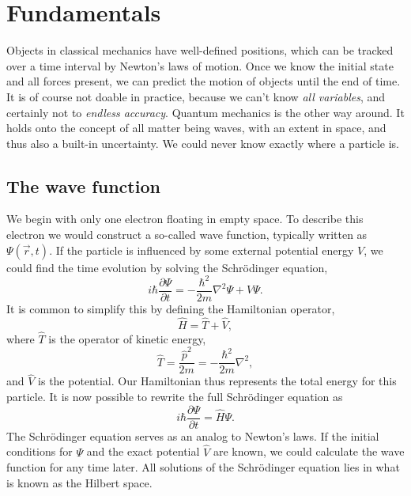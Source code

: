 \section{Fundamentals}
Objects in classical mechanics have well-defined positions, which can
be tracked over a time interval by Newton's laws of motion.
Once we know the initial state and all forces present, we can predict the
motion of objects until the end of time. 
It is of course not doable in practice, because we can't know \textit{all
variables}, and certainly not to \textit{endless accuracy}.
Quantum mechanics is the other way around.
It holds onto the concept of all matter being waves, with an extent in space,
and thus also a built-in uncertainty.
We could never know exactly where a particle is.

\subsection{The wave function}
We begin with only one electron floating in empty space.
To describe this electron we would construct a so-called wave function,
typically written as $\Psi(\vec{r},t)$.
If the particle is influenced by some external potential energy $V$, we could find
the time evolution by solving the Schrödinger equation,
\begin{equation}
\label{eq:qm:schrodinger}
i\hbar \frac{\partial \Psi}{\partial t} = - \frac{\hbar^2}{2m}
\nabla^2 \Psi+ V \Psi .
\end{equation}
It is common to simplify this by defining the Hamiltonian operator,
\begin{equation}
\hat{H} = \hat{T} + \hat{V},
\end{equation}
where $\hat{T}$ is the operator of kinetic energy,
\begin{equation}
\hat{T} = \frac{\hat{p}^2}{2m} = - \frac{\hbar^2}{2m} \nabla^2,
\end{equation}
and $\hat{V}$ is the potential. 
Our Hamiltonian thus represents the total energy for this particle.
It is now possible to rewrite the full Schrödinger equation as
\begin{equation}
\label{eq:qm:schrodingersimple}
i\hbar \frac{\partial \Psi}{\partial t} = \hat{H} \Psi .
\end{equation}
The Schrödinger equation serves as an analog to Newton's laws.
If the initial conditions for $\Psi$ and the exact potential $\hat{V}$ are known, 
we could calculate the wave function for any time later.
All solutions of the Schrödinger equation lies in what is known as the Hilbert
space.


